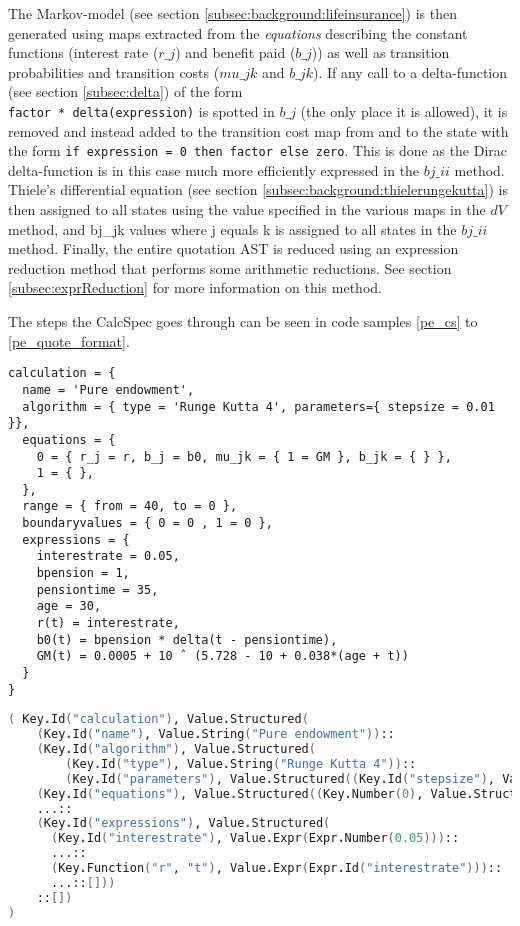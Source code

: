 The Markov-model (see section \ref{subsec:background:lifeinsurance}) is then generated using maps extracted from the \emph{equations} describing the constant functions (interest rate ($r\_j$) and benefit paid ($b\_j$)) as well as transition probabilities and transition costs ($mu\_jk$ and $b\_jk$).
If any call to a delta-function (see section \ref{subsec:delta}) of the form \\\lstinline$factor * delta(expression)$ is spotted in $b\_j$ (the only place it is allowed), it is removed and instead added to the transition cost map from and to the state with the form \lstinline$if expression = 0 then factor else zero$.
This is done as the Dirac delta-function is in this case much more efficiently expressed in the $bj\_ii$ method.
Thiele's differential equation (see section \ref{subsec:background:thielerungekutta}) is then assigned to all states using the value specified in the various maps in the $dV$ method, and bj\_jk values where j equals k is assigned to all states in the $bj\_ii$ method.
Finally, the entire quotation AST is reduced using an expression reduction method that performs some arithmetic reductions.
See section \ref{subsec:exprReduction} for more information on this method.

The steps the CalcSpec goes through can be seen in code samples \ref{pe_cs} to \ref{pe_quote_format}.
\clearpage
\begin{lstlisting}[language=calcspec, caption=Pure endowment in CalcSpec, label=pe_cs]
calculation = {
  name = 'Pure endowment',
  algorithm = { type = 'Runge Kutta 4', parameters={ stepsize = 0.01 }},
  equations = {
    0 = { r_j = r, b_j = b0, mu_jk = { 1 = GM }, b_jk = { } },
    1 = { },
  },
  range = { from = 40, to = 0 },
  boundaryvalues = { 0 = 0 , 1 = 0 },
  expressions = {
    interestrate = 0.05,
    bpension = 1,
    pensiontime = 35,
    age = 30,
    r(t) = interestrate,
    b0(t) = bpension * delta(t - pensiontime),
    GM(t) = 0.0005 + 10 ˆ (5.728 - 10 + 0.038*(age + t))
  }
}
\end{lstlisting}

\begin{lstlisting}[language=fsharp, caption=Abstract Syntax Tree for the Pure endowment CalcSpec, label=pe_ast]
( Key.Id("calculation"), Value.Structured(
    (Key.Id("name"), Value.String("Pure endowment"))::
    (Key.Id("algorithm"), Value.Structured(
        (Key.Id("type"), Value.String("Runge Kutta 4"))::
        (Key.Id("parameters"), Value.Structured((Key.Id("stepsize"), Value.Expr(Expr.Number(0.01)))::[])))::[])::
    (Key.Id("equations"), Value.Structured((Key.Number(0), Value.Structured(...:[]))::[]))::
    ...::
    (Key.Id("expressions"), Value.Structured(
      (Key.Id("interestrate"), Value.Expr(Expr.Number(0.05)))::
      ...::
      (Key.Function("r", "t"), Value.Expr(Expr.Id("interestrate")))::
      ...::[]))
    ::[])
)
\end{lstlisting}

